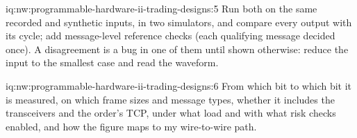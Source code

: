\begin{solution}{iq:nw:programmable-hardware-ii-trading-designs:5}
Run both on the same recorded and synthetic inputs, in two simulators, and compare every output with its cycle; add message-level reference
checks (each qualifying message decided once). A disagreement is a bug in one of them until shown otherwise: reduce the input to the
smallest case and read the waveform.
\end{solution}

\begin{solution}{iq:nw:programmable-hardware-ii-trading-designs:6}
From which bit to which bit it is measured, on which frame sizes and message types, whether it includes the transceivers and the order's
TCP, under what load and with what risk checks enabled, and how the figure maps to my wire-to-wire path.
\end{solution}
